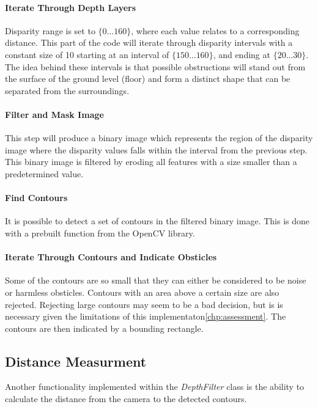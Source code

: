 \paragraph{Iterate Through Depth Layers}

Disparity range is set to $\{0 ... 160 \}$, where each value relates to a corresponding distance. This part of the code will iterate through disparity intervals with a constant size of 10 starting at an interval of $\{150 ... 160\}$, and ending at $\{20 ... 30 \}$. The idea behind these intervals is that possible obstructions will stand out from the surface of the ground level (floor) and form a distinct shape that can be separated from the surroundings.

\paragraph{Filter and Mask Image}

This step will produce a binary image which represents the region of the disparity image where the disparity values falls within the interval from the previous step. This binary image is filtered by eroding all features with a size smaller than a predetermined value.

\paragraph{Find Contours}

It is possible to detect a set of contours in the filtered binary image. This is done with a prebuilt function from the OpenCV library.

\paragraph{Iterate Through Contours and Indicate Obsticles}

Some of the contours are so small that they can either be considered to be noise or harmless obsticles. Contours with an area above a certain size are also rejected. Rejecting large contours may seem to be a bad decision, but is is necessary given the limitations of this implementaton\ref{chp:assessment}. The contours are then indicated by a bounding rectangle.

\subsection{Distance Measurment}

Another functionality implemented within the \textit{DepthFilter} class is the ability to calculate the distance from the camera to the detected contours. 

